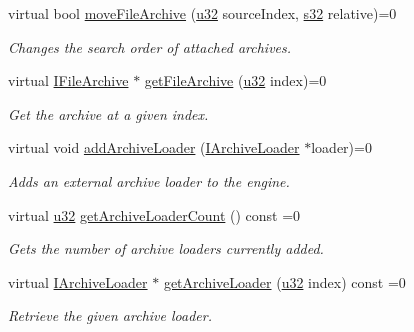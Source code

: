 \begin{DoxyCompactItemize}
virtual bool \hyperlink{classirr_1_1io_1_1IFileSystem_ae8530fb9793373cf4dbee956090e99f6}{move\+File\+Archive} (\hyperlink{namespaceirr_a0416a53257075833e7002efd0a18e804}{u32} source\+Index, \hyperlink{namespaceirr_ac66849b7a6ed16e30ebede579f9b47c6}{s32} relative)=0
\begin{DoxyCompactList}\small\item\em Changes the search order of attached archives. \end{DoxyCompactList}\item 
\mbox{\label{classirr_1_1io_1_1IFileSystem_a1ac4bfb7bfd7d2961af8e5c128190fae}} 
virtual \hyperlink{classirr_1_1io_1_1IFileArchive}{I\+File\+Archive} $\ast$ \hyperlink{classirr_1_1io_1_1IFileSystem_a1ac4bfb7bfd7d2961af8e5c128190fae}{get\+File\+Archive} (\hyperlink{namespaceirr_a0416a53257075833e7002efd0a18e804}{u32} index)=0
\begin{DoxyCompactList}\small\item\em Get the archive at a given index. \end{DoxyCompactList}\item 
virtual void \hyperlink{classirr_1_1io_1_1IFileSystem_ad56456302b4697c49b461a909d9269b9}{add\+Archive\+Loader} (\hyperlink{classirr_1_1io_1_1IArchiveLoader}{I\+Archive\+Loader} $\ast$loader)=0
\begin{DoxyCompactList}\small\item\em Adds an external archive loader to the engine. \end{DoxyCompactList}\item 
\mbox{\label{classirr_1_1io_1_1IFileSystem_ae1e958f65eb8b61b40f3c71a593f852d}} 
virtual \hyperlink{namespaceirr_a0416a53257075833e7002efd0a18e804}{u32} \hyperlink{classirr_1_1io_1_1IFileSystem_ae1e958f65eb8b61b40f3c71a593f852d}{get\+Archive\+Loader\+Count} () const =0
\begin{DoxyCompactList}\small\item\em Gets the number of archive loaders currently added. \end{DoxyCompactList}\item 
virtual \hyperlink{classirr_1_1io_1_1IArchiveLoader}{I\+Archive\+Loader} $\ast$ \hyperlink{classirr_1_1io_1_1IFileSystem_a175208d74556d1a0e4fe7400bbc65d7b}{get\+Archive\+Loader} (\hyperlink{namespaceirr_a0416a53257075833e7002efd0a18e804}{u32} index) const =0
\begin{DoxyCompactList}\small\item\em Retrieve the given archive loader. \end{DoxyCompactList}\item 

\end{DoxyCompactItemize}
